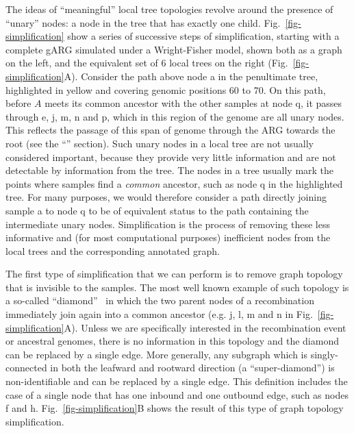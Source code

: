 \documentclass{article}
\begin{document}
The ideas of ``meaningful'' local tree topologies revolve around the
presence of ``unary'' nodes: a node in the tree that has exactly
one child. Fig.~\ref{fig-simplification} show a series of successive steps of
simplification, starting with a complete gARG simulated under a Wright-Fisher
model, shown both as a graph on the left, and the equivalent set of 6
local trees on the right (Fig.~\ref{fig-simplification}A). Consider the path above node
\textsf{a} in the penultimate tree, highlighted in yellow and covering genomic positions
60 to 70. On this path, before $A$ meets its common ancestor with the other samples at
node \textsf{q}, it passes through  \textsf{e},  \textsf{j},  \textsf{m},  \textsf{n} and
\textsf{p}, which in this region of the genome are all unary nodes. This reflects the
passage of this span of genome through the ARG towards the root (see the
``'' section).
Such unary nodes in a local tree are not usually considered important,
because they provide very little information and are not
detectable by information from the tree. %
The nodes in a tree usually mark the points where samples find a
 \emph{common} ancestor, such as node \textsf{q} in the highlighted
tree. For many purposes, we would therefore consider a path directly
joining sample \textsf{a} to node \textsf{q} to be of equivalent status to the path
containing the intermediate unary nodes. Simplification is the process of removing
these less informative and (for most computational purposes) inefficient nodes
from the local trees and the corresponding annotated graph.

The first type of simplification that we can perform is to remove
graph topology that is invisible to the samples. The most well
known example of such topology is a so-called
``diamond''~\citep{rasmussen2014genome}
in which the two parent nodes of a recombination immediately
join again into a common ancestor (e.g. \textsf{j}, \textsf{l}, \textsf{m}
and  \textsf{n} in Fig.~\ref{fig-simplification}A).
Unless we are specifically
interested in the recombination event or ancestral genomes,
there is no information in this topology and the diamond can be
replaced by a single edge. More generally, any
subgraph which is singly-connected in both the leafward and
rootward direction (a ``super-diamond'') is non-identifiable and can be
replaced by a single edge. This definition includes the case
of a single node that has one inbound and one outbound edge, such as
nodes \textsf{f} and \textsf{h}.
Fig.~\ref{fig-simplification}B shows the result of this type of
graph topology simplification.
\end{document}
